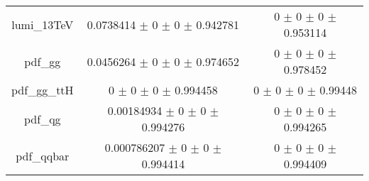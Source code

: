 \begin{table}
\begin{tabular}{ccc}
lumi\_13TeV & \num{0.0738414} $\pm$ \num{0} $\pm$ \num{0} $\pm$ \num{0.942781} & \num{0} $\pm$ \num{0} $\pm$ \num{0} $\pm$ \num{0.953114}\\
pdf\_gg & \num{0.0456264} $\pm$ \num{0} $\pm$ \num{0} $\pm$ \num{0.974652} & \num{0} $\pm$ \num{0} $\pm$ \num{0} $\pm$ \num{0.978452}\\
pdf\_gg\_ttH & \num{0} $\pm$ \num{0} $\pm$ \num{0} $\pm$ \num{0.994458} & \num{0} $\pm$ \num{0} $\pm$ \num{0} $\pm$ \num{0.99448}\\
pdf\_qg & \num{0.00184934} $\pm$ \num{0} $\pm$ \num{0} $\pm$ \num{0.994276} & \num{0} $\pm$ \num{0} $\pm$ \num{0} $\pm$ \num{0.994265}\\
pdf\_qqbar & \num{0.000786207} $\pm$ \num{0} $\pm$ \num{0} $\pm$ \num{0.994414} & \num{0} $\pm$ \num{0} $\pm$ \num{0} $\pm$ \num{0.994409}\\
\bottomrule
\end{tabular}
\end{table}